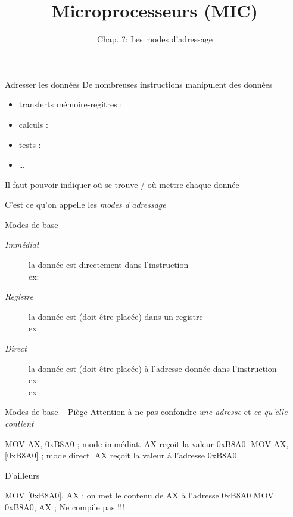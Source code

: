 \documentclass[14pt]{beamer}
\title{Microprocesseurs (MIC)}
\subtitle{Chap. ?: Les modes d'adressage}
\date{}
\begin{document}
\begin{frame}
\titlepage
\end{frame}

\begin{frame}[fragile]{Adresser les données}
De nombreuses instructions manipulent des données
	\begin{itemize}
	\item transferts mémoire-regitres : 
	\item calculs : 
	\item tests : 
	\item \dots
	\end{itemize}

\medskip
Il faut pouvoir indiquer où se trouve / où mettre chaque donnée

\medskip
C'est ce qu'on appelle les \emph{modes d'adressage}
\end{frame}

\begin{frame}[fragile]{Modes de base}
\begin{description}
  \item[\emph{Immédiat}] 
	la donnée est directement dans l'instruction
	\\ex:  
  \item[\emph{Registre}] la donnée est (doit être placée) dans un registre
	\\ex:  \asm{,} 
  \item[\emph{Direct}] la donnée est (doit être placée) à l'adresse donnée dans l'instruction
	\\ex:  \fbox{\asm{[0xB8A0]}}
	\\ex:  \fbox{\asm{[0xB8A2]}}
\end{description}
\end{frame}

\begin{frame}[fragile]{Modes de base -- Piège}
Attention à ne pas confondre \emph{une adresse} et \emph{ce qu'elle contient}
\begin{Asm}
	MOV AX, 0xB8A0      ; mode immédiat. AX reçoit la valeur 0xB8A0.
	MOV AX, [0xB8A0]    ; mode direct. AX reçoit la valeur à l'adresse 0xB8A0.
\end{Asm}
\bigskip
D'ailleurs
\begin{Asm}
	MOV [0xB8A0], AX    ; on met le contenu de AX à l'adresse 0xB8A0
	MOV 0xB8A0, AX      ; Ne compile pas !!!
\end{Asm}
\end{frame}
\end{document}
